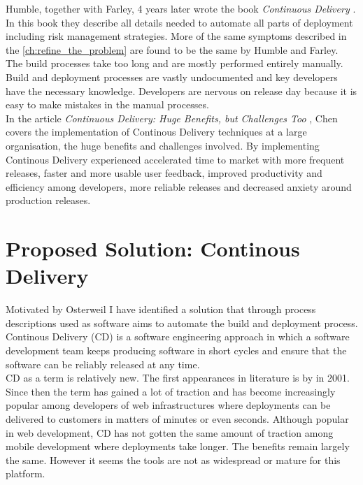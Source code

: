 \documentclass{ituthesis}
\begin{document}
Humble, together with Farley, 4 years later wrote the book \textit{Continuous Delivery} \cite{Humble2010}. In this book they describe all details needed to automate all parts of deployment including risk management strategies. More of the same symptoms described in the \autoref{ch:refine_the_problem} are found to be the same by Humble and Farley. The build processes take too long and are mostly performed entirely manually. Build and deployment processes are vastly undocumented and key developers have the necessary knowledge. Developers are nervous on release day because it is easy to make mistakes in the manual processes.\\

In the article \textit{Continuous Delivery: Huge Benefits, but Challenges Too} \cite{Chen2015}, Chen covers the implementation of Continous Delivery techniques at a large organisation, the huge benefits and challenges involved. By implementing Continous Delivery \cite{Chen2015} experienced accelerated time to market with more frequent releases, faster and more usable user feedback, improved productivity and efficiency among developers, more reliable releases and decreased anxiety around production releases.\\


\chapter{Proposed Solution: Continous Delivery}
\label{ch:proposed_solution}

Motivated by Osterweil \cite{Osterweil1997} I have identified a solution that through process descriptions used as software aims to automate the build and deployment process.\\

Continous Delivery (CD) is a software engineering approach in which a software development team keeps producing software in short cycles and ensure that the software can be reliably released at any time. \cite{Chen2015}\\

CD as a term is relatively new. The first appearances in literature is by \cite{beck2001agile} in 2001. Since then the term has gained a lot of traction and has become increasingly popular among developers of web infrastructures where deployments can be delivered to customers in matters of minutes or even seconds. Although popular in web development, CD has not gotten the same amount of traction among mobile development where deployments take longer. The benefits remain largely the same. However it seems the tools are not as widespread or mature for this platform.\\
\end{document}
